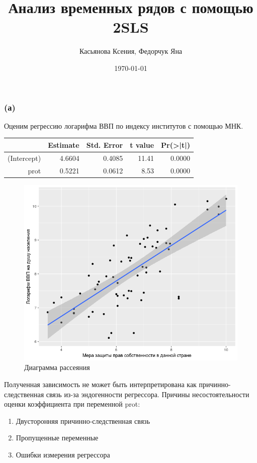 \documentclass[a4paper,12pt]{article} %
\author{Касьянова Ксения, Федорчук Яна  }
\title{Анализ временных рядов с помощью 2SLS}
\date{\today}
\begin{document}
\maketitle

\subsubsection*{(а)}	
	
Оценим регрессию логарифма ВВП по индексу институтов с помощью МНК.
	
	
\begin{table}[h!]
	\centering
	\begin{tabular}{rrrrr}
		\hline
		& Estimate & Std. Error & t value & Pr(>|t|) \\ 
		\hline
		(Intercept) & 4.6604 & 0.4085 & 11.41 & 0.0000 \\ 
		prot & 0.5221 & 0.0612 & 8.53 & 0.0000 \\ 
		\hline
	\end{tabular}
\end{table}	
	
\begin{figure}[h!]
	\centering
	\includegraphics[width=0.7\linewidth]{Rplot1}
	\caption[Диаграмма рассеяния]{Диаграмма рассеяния}
	\label{fig:rplot1}
\end{figure}



Полученная зависимость не может быть интерпретирована как
причинно-следственная связь из-за  эндогенности  регрессора. 
Причины несостоятельности оценки коэффициента при переменной prot:
\begin{enumerate}
	\item Двусторонняя причинно-следственная связь
\item Пропущенные переменные
\item Ошибки измерения регрессора
\end{enumerate}	
	
\end{document}
